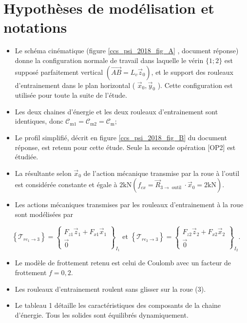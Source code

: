 \section*{Hypothèses de modélisation et notations}
\begin{itemize}
  \item Le schéma cinématique (figure \ref{ccs_psi_2018_fig_A} , document réponse) donne la configuration normale de travail dans laquelle le vérin $\{1 ; 2\}$ est supposé parfaitement vertical $\left(\overrightarrow{A B}=L_{v} \vec{z}_{0}\right)$, et le support des rouleaux d'entrainement dans le plan horizontal ( $\vec{x}_{0}, \vec{y}_{0}$ ). Cette configuration est utilisée pour toute la suite de l'étude.
  \item Les deux chaines d'énergie et les deux rouleaux d'entrainement sont identiques, donc $\mathcal{C}_{\mathrm{m} 1}=\mathcal{C}_{\mathrm{m} 2}=\mathcal{C}_{\mathrm{m}}$;
  \item Le profil simplifié, décrit en figure \ref{ccs_psi_2018_fig_B} du document réponse, est retenu pour cette étude. Seule la seconde opération [OP2] est étudiée.
  \item La résultante selon $\vec{x}_{0}$ de l'action mécanique transmise par la roue à l'outil est considérée constante et égale à $2 \mathrm{kN}\left(f_{c x}=\vec{R}_{3 \rightarrow \text { outil }} \cdot \vec{x}_{0}=2 \mathrm{kN}\right)$.
  \item Les actions mécaniques transmises par les rouleaux d'entrainement à la roue sont modélisées par
\end{itemize}

$$
\left\{\mathcal{T}_{r e_{1} \rightarrow 3}\right\}=\left\{\begin{array}{c}
F_{z 1} \vec{z}_{1}+F_{x 1} \vec{x}_{1} \\
\overrightarrow{0}
\end{array}\right\}_{I_{1}} \text { et }\left\{\mathcal{T}_{r e_{2} \rightarrow 3}\right\}=\left\{\begin{array}{c}
F_{z 2} \vec{z}_{2}+F_{x 2} \vec{x}_{2} \\
\overrightarrow{0}
\end{array}\right\}_{I_{2}} .
$$

\begin{itemize}
  \item Le modèle de frottement retenu est celui de Coulomb avec un facteur de frottement $f=0,2$.
  \item Les rouleaux d'entrainement roulent sans glisser sur la roue (3).
  \item Le tableau 1 détaille les caractéristiques des composants de la chaine d'énergie. Tous les solides sont équilibrés dynamiquement.
\end{itemize}

